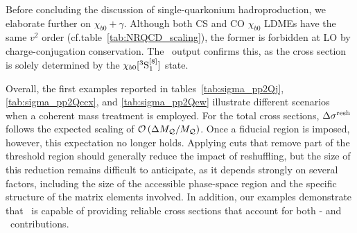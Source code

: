 Before concluding the discussion of single-quarkonium hadroproduction, we elaborate further on $\chi_{b0}+\gamma$. Although both CS and CO $\chi_{b0}$ LDMEs have the same $v^2$ order (cf.\@ table~\ref{tab:NRQCD_scaling}), the former is forbidden at LO by charge-conjugation conservation. The \mgshort\ output confirms this, as the cross section is solely determined by the $\chi_{b0}[^3 \mathrm{S}_1^{[8]}]$ state. 

Overall, the first examples reported in tables~\ref{tab:sigma_pp2Qj}, \ref{tab:sigma_pp2Qccx}, and \ref{tab:sigma_pp2Qew} illustrate different scenarios when a coherent mass treatment is employed. For the total cross sections, $\Delta \sigma^{\rm resh}$ follows the expected scaling of ${\cal O} \left( \Delta M_{\cal Q}/ M_{\cal Q}\right)$.
Once a fiducial region is imposed, however, this expectation no longer holds. Applying cuts that remove part of the threshold region should generally reduce the impact of reshuffling, but the size of this reduction remains difficult to anticipate, as it depends strongly on several factors, including the size of the accessible phase-space region and the specific structure of the matrix elements involved. 
In addition, our examples demonstrate that \madsons\ is capable of providing reliable cross sections that account for both \swave- and \pwavetxt\ contributions.


